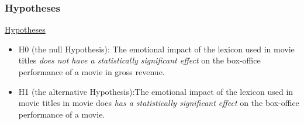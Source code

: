 \documentclass[font=10pt]{article}
\begin{document}
      \subsubsection{Hypotheses}

      \underline{Hypotheses}
      \begin{itemize}
        \item H0 (the null Hypothesis): The emotional impact of the lexicon used in movie titles \textit{does not have a statistically significant effect} on the box-office performance of a movie in gross revenue.
        \item H1 (the alternative Hypothesis):The emotional impact of the lexicon used in movie titles in movie does \textit{has a statistically significant effect} on the box-office performance of a movie.
      \end{itemize}
\end{document}
